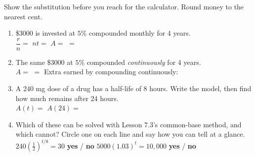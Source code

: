 \documentclass[10pt]{article}
\begin{document}
\begin{practicebox}
Show the substitution before you reach for the calculator. Round money to the nearest cent.
\begin{enumerate}[leftmargin=1.7em, itemsep=5pt]
  \item \$3000 is invested at $5\%$ compounded monthly for 4 years. \\[2pt]
        $\dfrac{r}{n}=$ \blank{1.8cm} \quad $nt=$ \blank{1.4cm} \quad
        $A=$ \blank{4.2cm} $=$ \blank{2.2cm}

  \item The same \$3000 at $5\%$ compounded \emph{continuously} for 4 years. \\[2pt]
        $A=$ \blank{3.6cm} $=$ \blank{2.2cm} \quad Extra earned by compounding continuously:
        \blank{1.8cm}

  \item A 240 mg dose of a drug has a half-life of 8 hours. Write the model, then find how much
        remains after 24 hours. \\[2pt]
        $A(t)=$ \blank{4.0cm} \hfill $A(24)=$ \blank{2.4cm}

  \item Which of these can be solved with Lesson 7.3's common-base method, and which cannot? Circle
        one on each line and say how you can tell at a glance.
        \\[2pt]
        \hspace*{1.0em} $240\left(\frac12\right)^{t/8}=30$ \quad \textbf{yes} / \textbf{no}
        \hfill
        $5000(1.03)^{t}=10{,}000$ \quad \textbf{yes} / \textbf{no}
        \\[2pt]
        \writeline
\end{enumerate}
\end{practicebox}
\end{document}
